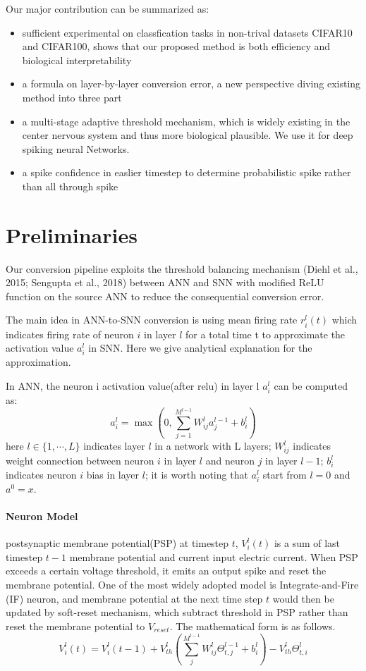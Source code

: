 \documentclass{article}
\begin{document}
Our major contribution can be summarized as:
\begin{itemize}
  \item sufficient experimental on classfication tasks in non-trival datasets CIFAR10 and CIFAR100, shows that our proposed method is both efficiency and biological interpretability
  \item a formula on layer-by-layer conversion error, a new perspective diving existing method into three part 
  \item a multi-stage adaptive threshold mechanism, which is widely existing in the center nervous system and thus more biological plausible. We use it for deep spiking neural Networks.
  \item a spike confidence in easlier timestep to determine probabilistic spike rather than all through spike
\end{itemize}


\section{Preliminaries}
Our conversion pipeline exploits the threshold balancing mechanism (Diehl et al., 2015; Sengupta
et al., 2018) between ANN and SNN with modified ReLU function on the source ANN to reduce
the consequential conversion error. 

The main idea in ANN-to-SNN conversion is using mean firing rate $r_i^l(t)$ which indicates firing rate of neuron $i$ in layer $l$ for a total time t to approximate the activation value $a_i^l$ in SNN.
Here we give analytical explanation for the approximation.

In ANN, the neuron i activation value(after relu) in layer l $a_i^l$ can be computed as:
\begin{equation}
  a_i^l = \operatorname{max}\left(0, \sum_{j=1}^{M^{l-1}}W_{ij}^la_j^{l-1} + b_i^l\right)
\end{equation}
here $l \in \{1, \cdots ,L\}$ indicates layer $l$ in a network with L layers; $W_{ij}^l$ indicates weight connection between neuron $i$ in layer $l$ and neuron $j$ in layer $l-1$;
$b_i^l$ indicates neuron $i$ bias in layer $l$; it is worth noting that $a_i^l$ start from $l=0$ and $a^0=x$.


\paragraph{Neuron Model} postsynaptic membrane potential(PSP) at timestep $t$, $V_i^l(t)$ is a sum of last timestep $t-1$ membrane potential and current input electric current. When PSP exceeds a certain voltage threshold, it emits an output spike and reset the membrane potential.
One of the most widely adopted model is Integrate-and-Fire (IF) neuron, and membrane potential at the next time
step $t$ would then be updated by soft-reset mechanism, which subtract threshold in PSP rather than reset the membrane potential to $V_{reset}$. The mathematical form is as follows.
\begin{equation}
V_i^l(t)=V_{i}^{l}(t-1)+V_{th}^l\left(\sum_j^{M^{l-1}}W_{ij}^l\Theta_{t,j}^{l-1}+b_i^l\right)-V_{th}^l\Theta_{t,i}^{l}
\end{equation}
\end{document}
